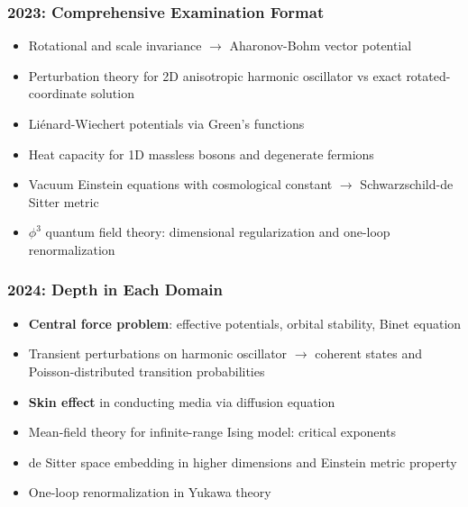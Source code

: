 \subsubsection*{2023: Comprehensive Examination Format}
\begin{itemize}
    \item Rotational and scale invariance $\to$ Aharonov-Bohm vector potential
    \item Perturbation theory for 2D anisotropic harmonic oscillator vs exact rotated-coordinate solution
    \item Li\'enard-Wiechert potentials via Green's functions
    \item Heat capacity for 1D massless bosons and degenerate fermions
    \item Vacuum Einstein equations with cosmological constant $\to$ Schwarzschild-de Sitter metric
    \item $\phi^3$ quantum field theory: dimensional regularization and one-loop renormalization
\end{itemize}

\subsubsection*{2024: Depth in Each Domain}
\begin{itemize}
    \item \textbf{Central force problem}: effective potentials, orbital stability, Binet equation
    \item Transient perturbations on harmonic oscillator $\to$ coherent states and Poisson-distributed transition probabilities
    \item \textbf{Skin effect} in conducting media via diffusion equation
    \item Mean-field theory for infinite-range Ising model: critical exponents
    \item de Sitter space embedding in higher dimensions and Einstein metric property
    \item One-loop renormalization in Yukawa theory
\end{itemize}

